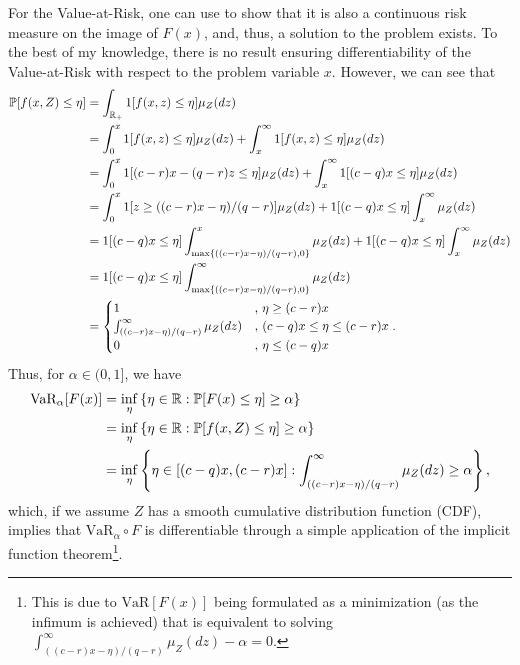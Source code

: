 \documentclass[12pt]{article}
\begin{document}
For the Value-at-Risk, one can use \citet[Theorem~2]{ivanovBilevelStochasticLinear2014} to show that it is also a continuous risk measure on the image of $F(x)$, and, thus, a solution to the problem exists.
To the best of my knowledge, there is no result ensuring differentiability of the Value-at-Risk with respect to the problem variable $x$.
However, we can see that
\begin{align*}
    \mathbb{P}[ f(x,Z) \le \eta] &= \int_{\mathbb{R}_{+}} 1[f(x,z) \le \eta] \mu_Z(dz) \\
    &= \int_{0}^{x} 1[f(x,z) \le \eta] \mu_Z(dz) + \int_{x}^{\infty} 1[f(x,z) \le \eta] \mu_Z(dz) \\
    &= \int_{0}^{x} 1[(c-r)x - (q-r)z \le \eta] \mu_Z(dz) + \int_{x}^{\infty} 1[(c-q)x \le \eta] \mu_Z(dz) \\
    &= \int_{0}^{x} 1[z \ge ((c-r)x - \eta) / (q-r)] \mu_Z(dz) + 1[(c-q)x \le \eta] \int_{x}^{\infty} \mu_Z(dz) \\
    &= 1[(c-q)x \le \eta] \int_{\max\{((c-r)x - \eta) / (q-r),0\}}^{x} \mu_Z(dz) + 1[(c-q)x \le \eta] \int_{x}^{\infty} \mu_Z(dz) \\
    &= 1[(c-q)x \le \eta] \int_{\max\{((c-r)x - \eta) / (q-r),0\}}^{\infty} \mu_Z(dz) \\
    &= \begin{cases}
	1 &,\, \eta \ge (c-r)x  \\
	\int_{((c-r)x - \eta) / (q-r)}^{\infty} \mu_Z(dz)  &,\, (c-q)x \le \eta \le  (c-r)x \\
	0  &,\, \eta \le (c-q)x
    \end{cases}
.\end{align*}
Thus, for $\alpha \in (0,1]$, we have 
\begin{align*}
    \text{VaR}_{\alpha}[F(x)] &= \inf_{\eta}\left\{ \eta \in \mathbb{R} : \mathbb{P}[ F(x) \le \eta] \ge \alpha  \right\} \\
    &= \inf_{\eta}\left\{ \eta \in \mathbb{R} : \mathbb{P}[ f(x,Z) \le \eta] \ge \alpha  \right\} \\
    &= \inf_{\eta}\left\{ \eta \in [(c-q)x,(c-r)x] : \int_{((c-r)x - \eta) / (q-r)}^{\infty} \mu_Z(dz) \ge \alpha   \right\}
,\end{align*} 
which, if we assume $Z$ has a smooth cumulative distribution function (CDF), implies that $\text{VaR}_\alpha \circ F$ is differentiable through a simple application of the implicit function theorem\footnote{This is due to $\text{VaR}[F(x)]$ being formulated as a minimization (as the infimum is achieved) that is equivalent to solving $\int_{((c-r)x - \eta) / (q-r)}^{\infty} \mu_Z(dz) - \alpha = 0$.}.
\end{document}
